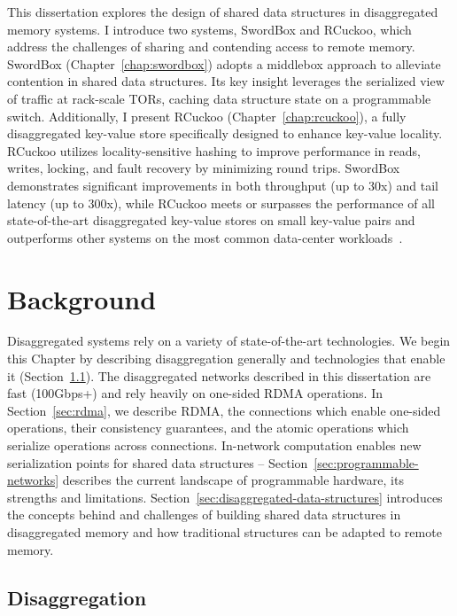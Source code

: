 \documentclass[12pt]{ucsddissertation}
\newcommand{\sword}{SwordBox}
\begin{document}
\begin{dissertationintroduction}
This dissertation explores the design of shared data structures in disaggregated memory systems. I
introduce two systems, {\sword} and RCuckoo, which address the challenges of sharing and contending
access to remote memory. {\sword} (Chapter~\ref{chap:swordbox}) adopts a middlebox approach to
alleviate contention in shared data structures. Its key insight leverages the serialized view of
traffic at rack-scale TORs, caching data structure state on a programmable switch. Additionally, I
present RCuckoo (Chapter~\ref{chap:rcuckoo}), a fully disaggregated key-value store specifically
designed to enhance key-value locality. RCuckoo utilizes locality-sensitive hashing to improve
performance in reads, writes, locking, and fault recovery by minimizing round trips. {\sword}
demonstrates significant improvements in both throughput (up to 30x) and tail latency (up to 300x),
while RCuckoo meets or surpasses the performance of all state-of-the-art disaggregated key-value
stores on small key-value pairs and outperforms other systems on the most common data-center
workloads~\cite{ycsb,facebook-memcached}.

\end{dissertationintroduction}

\chapter{Background}


Disaggregated systems rely on a variety of state-of-the-art technologies. We begin this Chapter by
describing disaggregation generally and technologies that enable it (Section~\ref{sec:disaggregation}). The
disaggregated networks described in this dissertation are fast (100Gbps+) and rely heavily on
one-sided RDMA operations. In Section~\ref{sec:rdma}, we describe RDMA, the connections which enable
one-sided operations, their consistency guarantees, and the atomic operations which serialize
operations across connections. In-network computation enables new serialization points for shared
data structures -- Section~\ref{sec:programmable-networks} describes the current landscape of
programmable hardware, its strengths and limitations.
Section~\ref{sec:disaggregated-data-structures} introduces the concepts behind and challenges of
building shared data structures in disaggregated memory and how traditional structures can be
adapted to remote memory.


\section{Disaggregation}
\label{sec:disaggregation}
\end{document}
